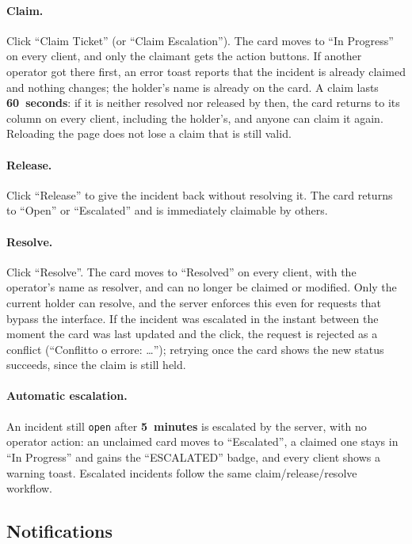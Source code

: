 \documentclass{scrartcl}
\begin{document}
\paragraph{Claim.} Click ``Claim Ticket'' (or ``Claim Escalation''). The card moves to ``In Progress'' on every client, and only the claimant gets the action buttons. If another operator got there first, an error toast reports that the incident is already claimed and nothing changes; the holder's name is already on the card. A claim lasts \textbf{60~seconds}: if it is neither resolved nor released by then, the card returns to its column on every client, including the holder's, and anyone can claim it again. Reloading the page does not lose a claim that is still valid.

\paragraph{Release.} Click ``Release'' to give the incident back without resolving it. The card returns to ``Open'' or ``Escalated'' and is immediately claimable by others.

\paragraph{Resolve.} Click ``Resolve''. The card moves to ``Resolved'' on every client, with the operator's name as resolver, and can no longer be claimed or modified. Only the current holder can resolve, and the server enforces this even for requests that bypass the interface. If the incident was escalated in the instant between the moment the card was last updated and the click, the request is rejected as a conflict (``Conflitto o errore: \ldots''); retrying once the card shows the new status succeeds, since the claim is still held.

\paragraph{Automatic escalation.} An incident still \texttt{open} after \textbf{5~minutes} is escalated by the server, with no operator action: an unclaimed card moves to ``Escalated'', a claimed one stays in ``In Progress'' and gains the ``ESCALATED'' badge, and every client shows a warning toast. Escalated incidents follow the same claim/release/resolve workflow.

\subsection{Notifications}\label{ug-notifications}
\end{document}
